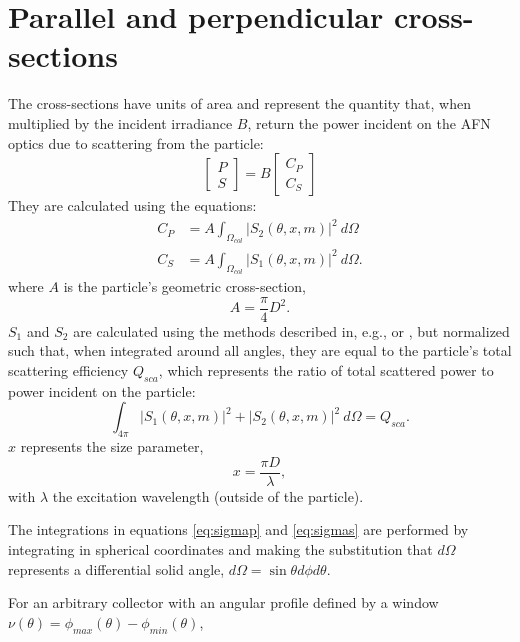 \documentclass[journal]{IEEEtran}
\begin{document}
\section{Parallel and perpendicular cross-sections}
The cross-sections have units of area and represent the quantity that, when multiplied by the incident irradiance $B$, return the power incident on the AFN optics due to scattering from the particle:
\begin{equation}
\begin{bmatrix}
    P\\
    S
\end{bmatrix}=
B
\begin{bmatrix}
    C_{\scriptstyle{P}}\\
    C_{\scriptstyle{S}}
\end{bmatrix}
\end{equation}
They are calculated using the equations:
\begin{align}
    C_{\scriptstyle{P}}&=A\int_{\Omega_{col}}|S_2(\theta, x, m)|^2\ d\Omega \label{eq:sigmap}\\
    C_{\scriptstyle{S}}&=A\int_{\Omega_{col}}|S_1(\theta, x, m)|^2\ d\Omega. \label{eq:sigmas}
\end{align}
where $A$ is the particle's geometric cross-section,
\begin{equation}
    A=\frac{\pi}{4}D^2.
\end{equation}
$S_1$ and $S_2$ are calculated using the methods described in, e.g., \cite{bohren_absorption_2004} or \cite{prahl_miepython_2023}, but normalized such that, when integrated around all angles, they are equal to the particle's total scattering efficiency $Q_{sca}$, which represents the ratio of total scattered power to power incident on the particle:
\begin{equation}
    \int_{4\pi}|S_1(\theta, x, m)|^2+|S_2(\theta, x, m)|^2\ d\Omega=Q_{sca}.
\end{equation}
$x$ represents the size parameter,
\begin{equation}
    x=\frac{\pi D}{\lambda},
\end{equation}
with $\lambda$ the excitation wavelength (outside of the particle).
\par The integrations in equations \ref{eq:sigmap} and \ref{eq:sigmas} are performed by integrating in spherical coordinates and making the substitution that $d\Omega$ represents a differential solid angle, $d\Omega=\sin{\theta}d\phi d\theta$. 
\par For an arbitrary collector with an angular profile defined by a window $\nu(\theta)=\phi_{max}(\theta)-\phi_{min}(\theta)$,
\end{document}
